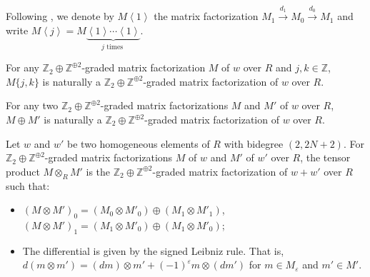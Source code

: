 \documentclass{amsart}
\theoremstyle{plain}
\theoremstyle{definition}
\theoremstyle{remark}
\numberwithin{equation}{section}
\begin{document}
Following \cite{KR1}, we denote by $M\left\langle 1\right\rangle$ the matrix factorization $M_1 \xrightarrow{d_1} M_0 \xrightarrow{d_0} M_1$ and write $M\left\langle j\right\rangle = M \underbrace{\left\langle 1\right\rangle\cdots\left\langle 1\right\rangle}_{j \text{ times }}$.

For any ${\mathbb{Z}}_2\oplus{\mathbb{Z}}^{\oplus2}$-graded matrix factorization $M$ of $w$ over $R$ and $j,k \in {\mathbb{Z}}$, $M\{j,k\}$ is naturally a ${\mathbb{Z}}_2\oplus{\mathbb{Z}}^{\oplus2}$-graded matrix factorization of $w$ over $R$.

For any two ${\mathbb{Z}}_2\oplus{\mathbb{Z}}^{\oplus2}$-graded matrix factorizations $M$ and $M'$ of $w$ over $R$, $M\oplus M'$ is naturally a ${\mathbb{Z}}_2\oplus{\mathbb{Z}}^{\oplus2}$-graded matrix factorization of $w$ over $R$.

Let $w$ and $w'$ be two homogeneous elements of $R$ with bidegree $(2,2N+2)$. For ${\mathbb{Z}}_2\oplus{\mathbb{Z}}^{\oplus2}$-graded matrix factorizations $M$ of $w$ and $M'$ of $w'$ over $R$, the tensor product $M\otimes_R M'$ is the ${\mathbb{Z}}_2\oplus{\mathbb{Z}}^{\oplus2}$-graded matrix factorization of $w+w'$ over $R$ such that:
\begin{itemize}
	\item $(M\otimes M')_0 = (M_0\otimes M'_0)\oplus (M_1\otimes M'_1)$, $(M\otimes M')_1 = (M_1\otimes M'_0)\oplus (M_1\otimes M'_0)$;
	\item The differential is given by the signed Leibniz rule. That is, $d(m\otimes m')=(dm)\otimes m' + (-1)^{\varepsilon} m \otimes (dm')$ for $m\in M_{\varepsilon}$ and $m'\in M'$.
\end{itemize}
\end{document}
